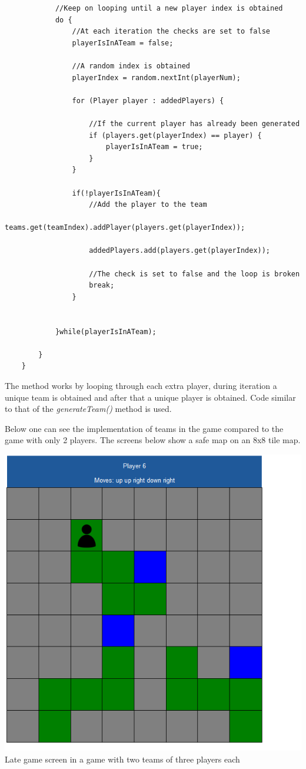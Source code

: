 \documentclass[a4paper,12pt]{extarticle}
\begin{document}
\begin{lstlisting}
            //Keep on looping until a new player index is obtained
            do {
                //At each iteration the checks are set to false
                playerIsInATeam = false;

                //A random index is obtained
                playerIndex = random.nextInt(playerNum);

                for (Player player : addedPlayers) {

                    //If the current player has already been generated
                    if (players.get(playerIndex) == player) {
                        playerIsInATeam = true;
                    }
                }

                if(!playerIsInATeam){
                    //Add the player to the team
                    teams.get(teamIndex).addPlayer(players.get(playerIndex));

                    addedPlayers.add(players.get(playerIndex));

                    //The check is set to false and the loop is broken
                    break;
                }


            }while(playerIsInATeam);

        }
    }
\end{lstlisting}

\noindent The method works by looping through each extra player, during iteration a unique team is obtained and after that a unique player is obtained. Code similar to that of the \textit{generateTeam()} method is used.

\noindent Below one can see the implementation of teams in the game compared to the game with only 2 players. The screens below show a safe map on an 8x8 tile map.

\begin{center}
\includegraphics[scale=0.5]{Team1.png}\\
Late game screen in a game with two teams of three players each
\end{center}
\end{document}
